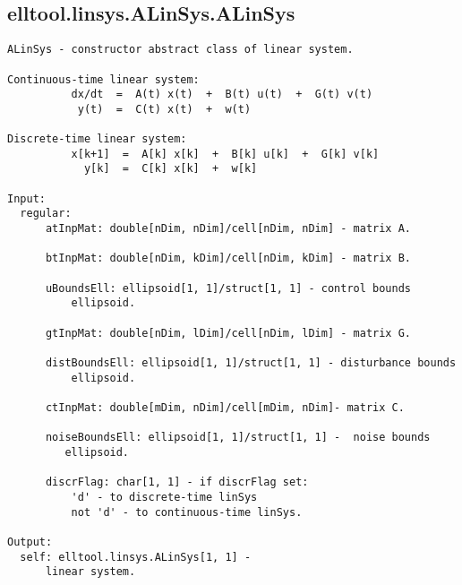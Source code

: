 \subsection{\texorpdfstring{elltool.linsys.ALinSys.ALinSys}{ALinSys}}\label{method:elltool.linsys.ALinSys.ALinSys}
\begin{verbatim}
ALinSys - constructor abstract class of linear system.

Continuous-time linear system:
          dx/dt  =  A(t) x(t)  +  B(t) u(t)  +  G(t) v(t)
           y(t)  =  C(t) x(t)  +  w(t)

Discrete-time linear system:
          x[k+1]  =  A[k] x[k]  +  B[k] u[k]  +  G[k] v[k]
            y[k]  =  C[k] x[k]  +  w[k]

Input:
  regular:
      atInpMat: double[nDim, nDim]/cell[nDim, nDim] - matrix A.

      btInpMat: double[nDim, kDim]/cell[nDim, kDim] - matrix B.

      uBoundsEll: ellipsoid[1, 1]/struct[1, 1] - control bounds
          ellipsoid.

      gtInpMat: double[nDim, lDim]/cell[nDim, lDim] - matrix G.

      distBoundsEll: ellipsoid[1, 1]/struct[1, 1] - disturbance bounds
          ellipsoid.

      ctInpMat: double[mDim, nDim]/cell[mDim, nDim]- matrix C.

      noiseBoundsEll: ellipsoid[1, 1]/struct[1, 1] -  noise bounds
         ellipsoid.

      discrFlag: char[1, 1] - if discrFlag set:
          'd' - to discrete-time linSys
          not 'd' - to continuous-time linSys.

Output:
  self: elltool.linsys.ALinSys[1, 1] -
      linear system.
\end{verbatim}
